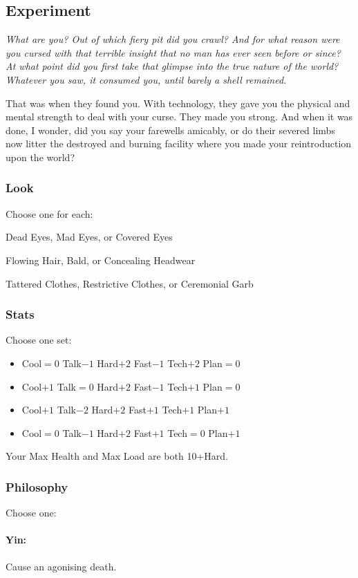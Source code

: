\subsection{Experiment}
{\itshape What \emph{are} you? Out of which fiery pit did you crawl?
  And for what reason were you cursed with that terrible insight that
  no man has ever seen before or since? At what point did you first
  take that glimpse into the true nature of the world?  Whatever you
  saw, it consumed you, until barely a shell remained.

That was when they found you. With technology, they gave you the
physical and mental strength to deal with your curse. They made you
strong. And when it was done, I wonder, did you say your farewells
amicably, or do their severed limbs now litter the destroyed and
burning facility where you made your reintroduction upon the world?}

\subsubsection{Look}
Choose one for each:

Dead Eyes, Mad Eyes, or Covered Eyes

Flowing Hair, Bald, or Concealing Headwear

Tattered Clothes, Restrictive Clothes, or Ceremonial Garb

\subsubsection{Stats}
Choose one set:
\begin{itemize}
\setlength\itemsep{0em}
\item Cool${=}0$ Talk$-1$ Hard$+2$ Fast$-1$ Tech$+2$ Plan${=}0$
\item Cool$+1$ Talk${=}0$ Hard$+2$ Fast$-1$ Tech$+1$ Plan${=}0$
\item Cool$+1$ Talk$-2$ Hard$+2$ Fast$+1$ Tech$+1$ Plan$+1$
\item Cool${=}0$ Talk$-1$ Hard$+2$ Fast$+1$ Tech${=}0$ Plan$+1$
\end{itemize}

Your Max Health and Max Load are both 10+Hard.

\subsubsection{Philosophy}
Choose one:
\paragraph{Yin:} Cause an agonising death.
